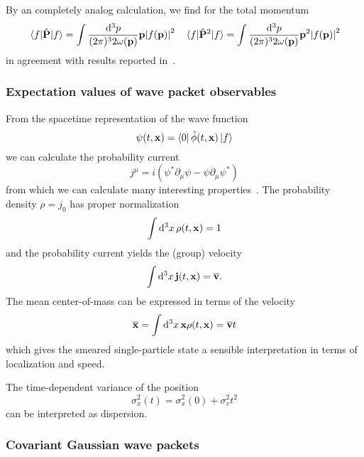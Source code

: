 By an completely analog calculation, we find for the total momentum
\begin{align}
	\expval{\hat{\vb{P}}}{f}
	=
	\int\frac{\dd[3]{p}}{(2\pi)^32\omega(\vb{p})}
	\vb{p}
	\abs{f(\vb{p})}^2
	&&
	\expval{\hat{\vb{P}}^2}{f}
	=
	\int\frac{\dd[3]{p}}{(2\pi)^32\omega(\vb{p})}
	\vb{p}^2
	\abs{f(\vb{p})}^2
\end{align}
in agreement with results reported in~\cite[eqs.~10 and 11]{Naumov2013}.

\subsubsection{Expectation values of wave packet observables}

From the spacetime representation of the wave function
\begin{equation}
	\psi(t,\vb{x})
	=
	\bra{0}\hat\phi(t,\vb{x})\ket{f}
\end{equation}
we can calculate the probability current
\begin{equation}
	j^\mu
	=
	i\left(
		\psi^*\partial_\mu\psi
		-
		\psi\partial_\mu\psi^*
	\right)
	\label{eq:qkg_probability_current}
\end{equation}
from which we can calculate many interesting properties~\cite{Naumov2013}.
The probability density $\rho=j_0$ has proper normalization
\begin{equation}
	\int\dd[3]{x}\rho(t,\vb{x})
	=
	1
\end{equation}
and the probability current yields the (group) velocity
\begin{equation}
	\int\dd[3]{x}\vb{j}(t,\vb{x})
	=
	\overline{\vb{v}}
	\label{qkg:group_velocity}.
\end{equation}
The mean center-of-mass can be expressed in terms of the velocity
\begin{equation}
	\overline{\vb{x}}
	=
	\int\dd[3]{x}\vb{x}\rho(t,\vb{x})
	=
	\overline{\vb{v}}t
	\label{qkg:mean_position}
\end{equation}
which gives the smeared single-particle state a sensible interpretation in terms of localization and speed.

The time-dependent variance of the position
\begin{equation}
	\sigma_x^2(t)
	=
	\sigma_x^2(0)
	+
	\sigma_v^2t^2
\end{equation}
can be interpreted as dispersion.

\subsubsection{Covariant Gaussian wave packets}

